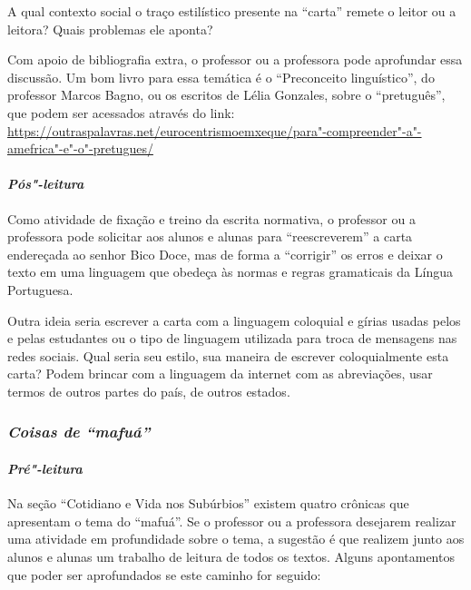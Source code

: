\documentclass{extarticle}
\begin{document}
A qual contexto social o traço estilístico presente na ``carta''
remete o leitor ou a leitora? Quais problemas ele aponta?

Com apoio de bibliografia extra, o professor ou a professora pode
aprofundar essa discussão. Um bom livro para essa temática é o
``Preconceito linguístico'', do professor Marcos Bagno, ou os escritos
de Lélia Gonzales, sobre o ``pretuguês'', que podem ser acessados
através do link:
\url{https://outraspalavras.net/eurocentrismoemxeque/para"-compreender"-a"-amefrica"-e"-o"-pretugues/}






\paragraph{\textit{Pós"-leitura}}

Como atividade de fixação e treino da escrita normativa, o professor ou
a professora pode solicitar aos alunos e alunas para ``reescreverem'' a
carta endereçada ao senhor Bico Doce, mas de forma a ``corrigir'' os
erros e deixar o texto em uma linguagem que obedeça às normas e regras
gramaticais da Língua Portuguesa.

Outra ideia seria escrever a carta com a linguagem coloquial e gírias
usadas pelos e pelas estudantes ou o tipo de linguagem utilizada para
troca de mensagens nas redes sociais. Qual seria seu estilo, sua maneira
de escrever coloquialmente esta carta? Podem brincar com a linguagem da
internet com as abreviações, usar termos de outros partes do país, de
outros estados.

\subsubsection{\textit{Coisas de ``mafuá''}}

\paragraph{\textit{Pré"-leitura}}

Na seção ``Cotidiano e Vida nos Subúrbios'' existem quatro crônicas que
apresentam o tema do ``mafuá''. Se o professor ou a professora desejarem
realizar uma atividade em profundidade sobre o tema, a sugestão é que
realizem junto aos alunos e alunas um trabalho de leitura de todos os
textos. Alguns apontamentos que poder ser aprofundados se este caminho
for seguido:
\end{document}
